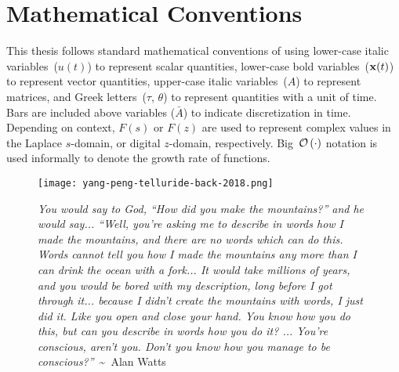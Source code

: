 \cleardoublepage
\renewcommand\contentsname{Table of Contents}
\tableofcontents
\cleardoublepage
{}

\iffalse
\addcontentsline{toc}{chapter}{List of Todos}
\listoftodos
\cleardoublepage
\phantomsection
\fi

\listoftables
\cleardoublepage
{}

\listoffigures
\cleardoublepage
{}

\listoftheorems[ignoreall,show={theorem,lemma}]
\cleardoublepage
{}

\chapter*{Mathematical Conventions}
\label{typography}

This thesis follows standard mathematical conventions of using lower-case italic variables~($u(t)$) to represent scalar quantities, lower-case bold variables~($\mathbf{x}(t)$) to represent vector quantities, upper-case italic variables~($A$) to represent matrices, and Greek letters~($\tau$, $\theta$) to represent quantities with a unit of time.
Bars are included above variables ($\bar{A}$) to indicate discretization in time.
Depending on context, $F(s)$ or $F(z)$ are used to represent complex values in the Laplace $s$-domain, or digital $z$-domain, respectively.
Big~$\mathcal{O}\left({\cdot}\right)$ notation is used informally to denote the growth rate of functions.

\cleardoublepage
{}

\begin{figure}
\centering
\vspace*{\fill}
\begingroup
\texttt{[image: yang-peng-telluride-back-2018.png]}
\endgroup

\vspace{1em} 

\caption*{{\tiny \emph{You would say to God, ``How did you make the mountains?'' and he would say... ``Well, you're asking me to describe in words how I made the mountains, and there are no words which can do this. Words cannot tell you how I made the mountains any more than I can drink the ocean with a fork... It would take millions of years, and you would be bored with my description, long before I got through it... because I didn't create the mountains with words, I just did it. Like you open and close your hand. You know how you do this, but can you describe in words how you do it? ... You're conscious, aren't you. Don't you know how you manage to be conscious?''}~\textasciitilde~Alan Watts}}

\vspace*{\fill}
\end{figure}

\cleardoublepage
{}


